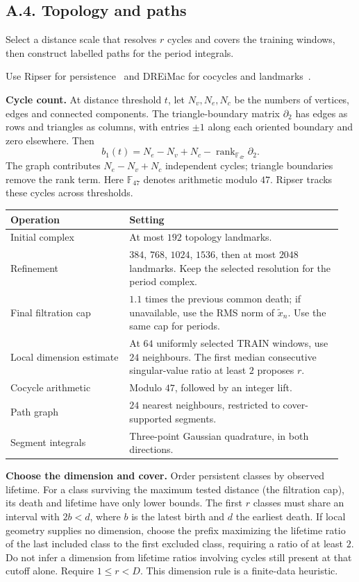 \documentclass[11pt,a4paper]{article}
\begin{document}
\subsection*{A.4. Topology and paths}
\label{app:topology}
Select a distance scale that resolves $r$ cycles and covers the training
windows, then construct labelled paths for the period integrals.

Use Ripser for persistence~\citep{Bauer2021} and DREiMac for cocycles and
landmarks~\citep{Perea2023}.

\textbf{Cycle count.}
At distance threshold $t$, let $N_v,N_e,N_c$ be the numbers of vertices,
edges and connected components. The triangle-boundary matrix $\partial_2$
has edges as rows and triangles as columns, with entries $\pm1$ along
each oriented boundary and zero elsewhere. Then
\[
b_1(t)=N_e-N_v+N_c-\operatorname{rank}_{\mathbb F_{47}}\partial_2.
\]
The graph contributes $N_e-N_v+N_c$ independent cycles; triangle boundaries
remove the rank term. Here $\mathbb F_{47}$ denotes arithmetic modulo $47$.
Ripser tracks these cycles across thresholds.
\begin{center}
\begin{tabular}{@{}p{0.34\linewidth}p{0.61\linewidth}@{}}
\toprule
Operation & Setting\\
\midrule
Initial complex & At most $192$ topology landmarks.\\
Refinement & $384$, $768$, $1024$, $1536$, then at most $2048$ landmarks.
Keep the selected resolution for the period complex.\\
Final filtration cap & $1.1$ times the previous common death; if unavailable,
use the RMS norm of $\widetilde x_n$. Use the same cap for periods.\\
Local dimension estimate & At $64$ uniformly selected TRAIN windows,
use $24$ neighbours. The first median consecutive singular-value ratio
at least $2$ proposes $r$.\\
Cocycle arithmetic & Modulo $47$, followed by an integer lift.\\
Path graph & $24$ nearest neighbours, restricted to cover-supported segments.\\
Segment integrals & Three-point Gaussian quadrature, in both directions.\\
\bottomrule
\end{tabular}
\end{center}

\textbf{Choose the dimension and cover.}
Order persistent classes by observed lifetime. For a class surviving the
maximum tested distance (the filtration cap), its death and lifetime
have only lower bounds.
The first $r$ classes must share an interval with $2b<d$, where $b$ is
the latest birth and $d$ the earliest death.
If local geometry supplies no dimension, choose the prefix maximizing the lifetime ratio of the last included
class to the first excluded class, requiring a ratio of at least $2$.
Do not infer a dimension from lifetime ratios involving cycles still
present at that cutoff alone.
Require $1\le r<D$. This dimension rule is a finite-data heuristic.
\end{document}

